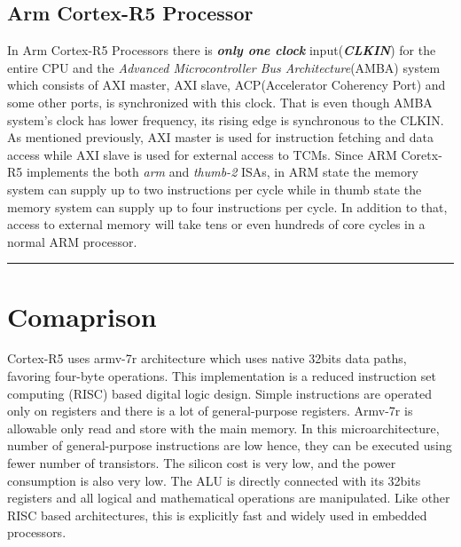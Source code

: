 \documentclass[a4paper,11pt]{article}
\begin{document}
\subsection{Arm Cortex-R5 Processor}
In Arm Cortex-R5 Processors there is \textbf{\textit{only one clock}} input(\textbf{\textit{CLKIN}}) for the entire CPU and the \textit{Advanced Microcontroller Bus Architecture}(AMBA) system which consists of AXI master, AXI slave, ACP(Accelerator Coherency Port) and some other ports, is synchronized with this clock. That is even though AMBA system's clock has lower frequency, its rising edge is synchronous to the CLKIN. As mentioned previously, AXI master is used for instruction fetching and data access while AXI slave is used for external access to TCMs. Since ARM Coretx-R5 implements the both \textit{arm} and \textit{thumb-2} ISAs, in ARM state the memory system can supply up to two instructions per cycle while in thumb state the memory system can supply up to four instructions per cycle. In addition to that, access to external memory will take tens or even hundreds of core cycles in a normal ARM processor.




\vspace{1cm}\hrule

\section{Comaprison}

Cortex-R5 uses armv-7r architecture which uses native 32bits data paths, favoring four-byte operations. This implementation is a reduced instruction set computing (RISC) based digital logic design. Simple instructions are operated only on registers and there is a lot of general-purpose registers. Armv-7r is allowable only read and store with the main memory. In this microarchitecture, number of general-purpose instructions are low hence, they can be executed using fewer number of transistors. The silicon cost is very low, and the power consumption is also very low. The ALU is directly connected with its 32bits registers and all logical and mathematical operations are manipulated. Like other RISC based architectures, this is explicitly fast and widely used in embedded processors.\\
\end{document}
